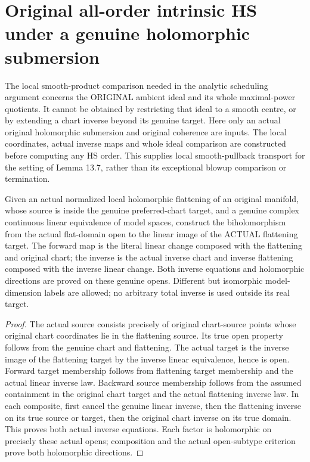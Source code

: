 \section{Original all-order intrinsic HS under a genuine holomorphic submersion}

The local smooth-product comparison needed in the analytic scheduling
argument concerns the ORIGINAL ambient ideal and its whole maximal-power
quotients. It cannot be obtained by restricting that ideal to a smooth
centre, or by extending a chart inverse beyond its genuine target. Here
only an actual original holomorphic submersion and original coherence are
inputs. The local coordinates, actual inverse maps and whole ideal
comparison are constructed before computing any HS order. This supplies
local smooth-pullback transport for the setting of Lemma 13.7, rather than
its exceptional blowup comparison or termination.

\begin{lemma}
\label{hir:actual-flat-open-linear-coordinate-biholomorphism}
\leanok
Given an actual normalized local holomorphic flattening of an original
manifold, whose source is inside the genuine preferred-chart target,
and a genuine complex continuous linear equivalence of model spaces,
construct the biholomorphism from the actual flat-domain open to the
linear image of the ACTUAL flattening target. The forward map is the
literal linear change composed with the flattening and original chart;
the inverse is the actual inverse chart and inverse flattening composed
with the inverse linear change. Both inverse equations and holomorphic
directions are proved on these genuine opens. Different but isomorphic
model-dimension labels are allowed; no arbitrary total inverse is used
outside its real target.
\end{lemma}
\begin{proof}
The actual source consists precisely of original chart-source points
whose original chart coordinates lie in the flattening source. Its true
open property follows from the genuine chart and flattening. The actual
target is the inverse image of the flattening target by the inverse
linear equivalence, hence is open. Forward target membership follows
from flattening target membership and the actual linear inverse law.
Backward source membership follows from the assumed containment in the
original chart target and the actual flattening inverse law. In each
composite, first cancel the genuine linear inverse, then the flattening
inverse on its true source or target, then the original chart inverse
on its true domain. This proves both actual inverse equations. Each
factor is holomorphic on precisely these actual opens; composition and
the actual open-subtype criterion prove both holomorphic directions.
\end{proof}

